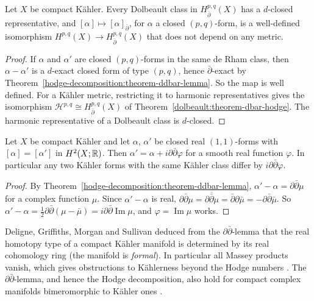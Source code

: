 \begin{corollary}\label{hodge-decomposition:corollary-canonical-dolbeault}
Let $X$ be compact K\"ahler. Every Dolbeault class in $H^{p,q}_{\bar\partial}(X)$ has a $d$-closed representative, and
$[\alpha] \mapsto [\alpha]_{\bar\partial}$, for $\alpha$ a closed $(p,q)$-form, is a well-defined isomorphism
$H^{p,q}(X) \to H^{p,q}_{\bar\partial}(X)$ that does not depend on any metric.
\end{corollary}

\begin{proof}
If $\alpha$ and $\alpha'$ are closed $(p,q)$-forms in the same de Rham class, then $\alpha - \alpha'$ is a $d$-exact closed form of type
$(p,q)$, hence $\bar\partial$-exact by Theorem~\ref{hodge-decomposition:theorem-ddbar-lemma}. So the map is well defined. For a K\"ahler
metric, restricting it to harmonic representatives gives the isomorphism
$\mathcal{H}^{p,q} \cong H^{p,q}_{\bar\partial}(X)$ of Theorem~\ref{dolbeault:theorem-dbar-hodge}. The harmonic representative of a Dolbeault
class is $d$-closed.
\end{proof}

\begin{corollary}\label{hodge-decomposition:corollary-ddbar-real}
Let $X$ be compact K\"ahler and let $\alpha$, $\alpha'$ be closed real $(1,1)$-forms with $[\alpha] = [\alpha']$ in $H^2(X; \mathbb{R})$. Then
$\alpha' = \alpha + i\partial\bar\partial\varphi$ for a smooth real function $\varphi$. In particular any two K\"ahler forms with the same
K\"ahler class differ by $i\partial\bar\partial\varphi$.
\end{corollary}

\begin{proof}
By Theorem~\ref{hodge-decomposition:theorem-ddbar-lemma}, $\alpha' - \alpha = \partial\bar\partial\mu$ for a complex function $\mu$. Since
$\alpha' - \alpha$ is real, $\partial\bar\partial\mu = \overline{\partial\bar\partial\mu} = \bar\partial\partial\bar\mu = -\partial\bar\partial\bar\mu$. So
$\alpha' - \alpha = \frac12\partial\bar\partial(\mu - \bar\mu) = i\partial\bar\partial\operatorname{Im}\mu$, and $\varphi = \operatorname{Im}\mu$ works.
\end{proof}

\begin{remark}\label{hodge-decomposition:remark-formality}
Deligne, Griffiths, Morgan and Sullivan deduced from the $\partial\bar\partial$-lemma that the real homotopy type of a compact K\"ahler
manifold is determined by its real cohomology ring (the manifold is \emph{formal}). In particular all Massey products vanish, which gives
obstructions to K\"ahlerness beyond the Hodge numbers \cite{dgms}. The $\partial\bar\partial$-lemma, and hence the Hodge decomposition, also
hold for compact complex manifolds bimeromorphic to K\"ahler ones \cite{dgms}.
\end{remark}

